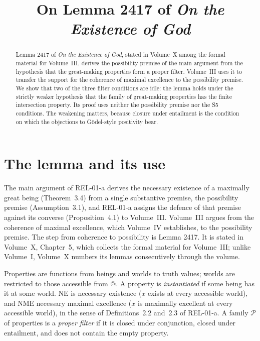 \documentclass{situationist-preprint}
\title{On Lemma 2417 of \emph{On the Existence of God}}
\begin{document}
\maketitle

\begin{abstract}
Lemma 2417 of \emph{On the Existence of God}, stated in Volume~X among the formal material for Volume~III, derives the possibility premise of the main argument from the hypothesis that the great-making properties form a proper filter. Volume~III uses it to transfer the support for the coherence of maximal excellence to the possibility premise. We show that two of the three filter conditions are idle: the lemma holds under the strictly weaker hypothesis that the family of great-making properties has the finite intersection property. Its proof uses neither the possibility premise nor the S5 conditions. The weakening matters, because closure under entailment is the condition on which the objections to Gödel-style positivity bear.
\end{abstract}

\section{The lemma and its use}

The main argument of REL-01-a derives the necessary existence of a maximally great being (Theorem~3.4) from a single substantive premise, the possibility premise (Assumption~3.1), and REL-01-a assigns the defence of that premise against its converse (Proposition~4.1) to Volume~III. Volume~III argues from the coherence of maximal excellence, which Volume~IV establishes, to the possibility premise. The step from coherence to possibility is Lemma 2417. It is stated in Volume~X, Chapter~5, which collects the formal material for Volume~III; unlike Volume~I, Volume~X numbers its lemmas consecutively through the volume.

Properties are functions from beings and worlds to truth values; worlds are restricted to those accessible from $@$. A property is \emph{instantiated} if some being has it at some world. $\mathrm{NE}$ is necessary existence ($x$ exists at every accessible world), and $\mathrm{NME}$ necessary maximal excellence ($x$ is maximally excellent at every accessible world), in the sense of Definitions~2.2 and~2.3 of REL-01-a. A family $\mathcal{P}$ of properties is a \emph{proper filter} if it is closed under conjunction, closed under entailment, and does not contain the empty property.
\end{document}
